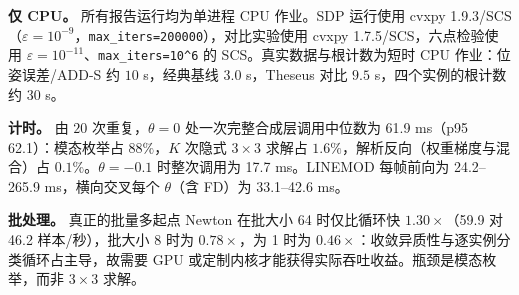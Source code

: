 \textbf{仅 CPU。} 所有报告运行均为单进程 CPU 作业。SDP 运行使用 cvxpy 1.9.3/SCS（$\varepsilon=10^{-9}$，\texttt{max\_iters=200000}），对比实验使用 cvxpy 1.7.5/SCS，六点检验使用 $\varepsilon=10^{-11}$、\texttt{max\_iters=10\textasciicircum 6} 的 SCS。真实数据与根计数为短时 CPU 作业：位姿误差/ADD-S 约 $10$ s，经典基线 $3.0$ s，Theseus 对比 $9.5$ s，四个实例的根计数约 $30$ s。

\textbf{计时。} 由 $20$ 次重复，$\theta=0$ 处一次完整合成层调用中位数为 61.9 ms（p95 62.1）：模态枚举占 $88\%$，$K$ 次隐式 $3\times3$ 求解占 $1.6\%$，解析反向（权重梯度与混合）占 $0.1\%$。$\theta=-0.1$ 时整次调用为 17.7 ms。LINEMOD 每帧前向为 24.2--265.9 ms，横向交叉每个 $\theta$（含 FD）为 33.1--42.6 ms。

\textbf{批处理。} 真正的批量多起点 Newton 在批大小 64 时仅比循环快 $1.30\times$（59.9 对 46.2 样本/秒），批大小 8 时为 $0.78\times$，为 1 时为 $0.46\times$：收敛异质性与逐实例分类循环占主导，故需要 GPU 或定制内核才能获得实际吞吐收益。瓶颈是模态枚举，而非 $3\times3$ 求解。
